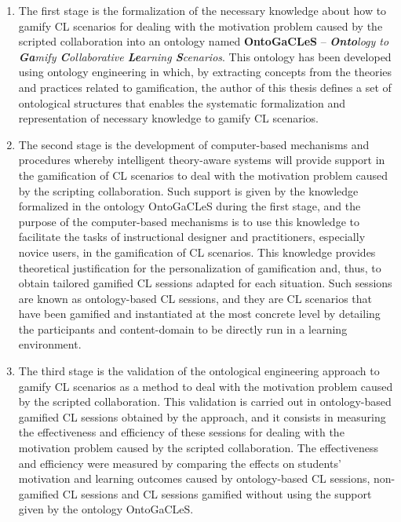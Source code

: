 \begin{enumerate}
\item
The first stage is the formalization of the necessary knowledge about how to gamify CL scenarios for dealing with the motivation problem caused by the scripted collaboration into an ontology named \textbf{OntoGaCLeS} – \emph{\textbf{Onto}logy to \textbf{Ga}mify \textbf{C}ollaborative \textbf{Le}arning \textbf{S}cenarios}. This ontology has been developed using ontology engineering in which, by extracting concepts from the theories and practices related to gamification, the author of this thesis defines a set of ontological structures that enables the systematic formalization and representation of necessary knowledge to gamify CL scenarios.

\item
The second stage is the development of computer-based mechanisms and procedures whereby intelligent theory-aware systems will provide support in the gamification of CL scenarios to deal with the motivation problem caused by the scripting collaboration. Such support is given by the knowledge formalized in the ontology OntoGaCLeS during the first stage, and the purpose of the computer-based mechanisms is to use this knowledge to facilitate the tasks of instructional designer and practitioners, especially novice users, in the gamification of CL scenarios. This knowledge provides theoretical justification for the personalization of gamification and, thus, to obtain tailored gamified CL sessions adapted for each situation. Such sessions are known as ontology-based CL sessions, and they are CL scenarios that have been gamified and instantiated at the most concrete level by detailing the participants and content-domain to be directly run in a learning environment.

\item
The third stage is the validation of the ontological engineering approach to gamify CL scenarios as a method to deal with the motivation problem caused by the scripted collaboration. This validation is carried out in ontology-based gamified CL sessions obtained by the approach, and it consists in measuring the effectiveness and efficiency of these sessions for dealing with the motivation problem caused by the scripted collaboration. The effectiveness and efficiency were measured by comparing the effects on students' motivation and learning outcomes caused by ontology-based CL sessions, non-gamified CL sessions and CL sessions gamified without using the support given by the ontology OntoGaCLeS.
\end{enumerate}

